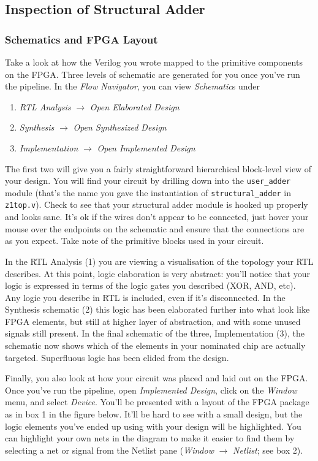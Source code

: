 \documentclass[11pt]{article}
\begin{document}
\subsection{Inspection of Structural Adder}
\subsubsection{Schematics and FPGA Layout}
Take a look at how the Verilog you wrote mapped to the primitive components on the FPGA.
Three levels of schematic are generated for you once you've run the pipeline.
In the \emph{Flow Navigator}, you can view \emph{Schematic}s under

\begin{enumerate}
  \item \emph{RTL Analysis} $\rightarrow$ \emph{Open Elaborated Design}
  \item \emph{Synthesis} $\rightarrow$ \emph{Open Synthesized Design}
  \item \emph{Implementation} $\rightarrow$ \emph{Open Implemented Design}
\end{enumerate}

The first two will give you a fairly straightforward hierarchical block-level view of your design. You will find your circuit by drilling down into the \verb|user_adder| module (that's the name you gave the instantiation of \verb|structural_adder| in \verb|z1top.v|).
Check to see that your structural adder module is hooked up properly and looks sane.
It's ok if the wires don't appear to be connected, just hover your mouse over the endpoints on the schematic and ensure that the connections are as you expect.
Take note of the primitive blocks used in your circuit.

In the RTL Analysis (1) you are viewing a visualisation of the topology your RTL describes. At this point, logic elaboration is very abstract: you'll notice that your logic is expressed in terms of the logic gates you described (XOR, AND, etc). Any logic you describe in RTL is included, even if it's disconnected. In the Synthesis schematic (2) this logic has been elaborated further into what look like FPGA elements, but still at higher layer of abstraction, and with some unused signals still present. In the final schematic of the three, Implementation (3), the schematic now shows which of the elements in your nominated chip are actually targeted. Superfluous logic has been elided from the design.

Finally, you also look at how your circuit was placed and laid out on the FPGA. Once you've run the pipeline, open \emph{Implemented Design}, click on the \emph{Window} menu, and select \emph{Device}. You'll be presented with a layout of the FPGA package as in box 1 in the figure below. It'll be hard to see with a small design, but the logic elements you've ended up using with your design will be highlighted. You can highlight your own nets in the diagram to make it easier to find them by selecting a net or signal from the Netlist pane (\emph{Window} $\rightarrow$ \emph{Netlist}; see box 2).
\end{document}
